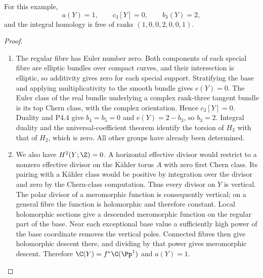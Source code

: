 \begin{proposition}[P4.5]\hypertarget{tag-02XO}{}\label{night:P4.5}\label{stmt:P4.5}

For this example,
\[
 a(Y)=1,\qquad c_3[Y]=0,\qquad b_3(Y)=2,
\]
and the integral homology is free of ranks $(1,0,0,2,0,0,1)$.
\end{proposition}
\begin{proof}

\begin{enumerate}[label={$\langle1\rangle$\arabic*.},leftmargin=*]
\item The regular fibre has Euler number zero. Both components of each special
fibre are elliptic bundles over compact curves, and their intersection is
elliptic, so additivity gives zero for each special support. Stratifying
the base and applying multiplicativity to the smooth bundle gives
$e(Y)=0$. The Euler class of the real bundle underlying a complex
rank-three tangent bundle is its top Chern class, with the complex
orientation. Hence $c_3[Y]=0$. Duality and P4.4 give $b_4=b_5=0$ and
$e(Y)=2-b_3$, so $b_3=2$. Integral duality and the universal-coefficient
theorem identify the torsion of $H_3$ with that of $H_2$, which is zero.
All other groups have already been determined.

\item We also have $H^2(Y;\Z)=0$. A horizontal effective divisor would restrict
to a nonzero effective divisor on the Kähler torus $A$ with zero first
Chern class. Its pairing with a Kähler class would be positive by
integration over the divisor and zero by the Chern-class computation.
Thus every divisor on $Y$ is vertical. The polar divisor of a meromorphic
function is consequently vertical; on a general fibre the function is
holomorphic and therefore constant. Local holomorphic sections give a
descended meromorphic function on the regular part of the base. Near
each exceptional base value a sufficiently high power of the base
coordinate removes the vertical poles. Connected fibres then give
holomorphic descent there, and dividing by that power gives meromorphic
descent. Therefore $\C(Y)=f^*\C(\Pp^1)$ and $a(Y)=1$.

\end{enumerate}
\end{proof}